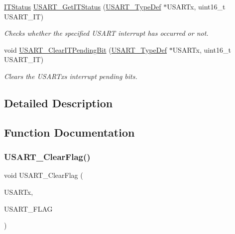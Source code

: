 \begin{DoxyCompactItemize}
\hyperlink{group___exported__types_gaacbd7ed539db0aacd973a0f6eca34074}{I\+T\+Status} \hyperlink{group___u_s_a_r_t___private___functions_ga93d8f031241bcdbe938d091a85295445}{U\+S\+A\+R\+T\+\_\+\+Get\+I\+T\+Status} (\hyperlink{struct_u_s_a_r_t___type_def}{U\+S\+A\+R\+T\+\_\+\+Type\+Def} $\ast$U\+S\+A\+R\+Tx, uint16\+\_\+t U\+S\+A\+R\+T\+\_\+\+IT)
\begin{DoxyCompactList}\small\item\em Checks whether the specified U\+S\+A\+RT interrupt has occurred or not. \end{DoxyCompactList}\item 
void \hyperlink{group___u_s_a_r_t___private___functions_ga1fc25d0338695063be5e50156955d9bc}{U\+S\+A\+R\+T\+\_\+\+Clear\+I\+T\+Pending\+Bit} (\hyperlink{struct_u_s_a_r_t___type_def}{U\+S\+A\+R\+T\+\_\+\+Type\+Def} $\ast$U\+S\+A\+R\+Tx, uint16\+\_\+t U\+S\+A\+R\+T\+\_\+\+IT)
\begin{DoxyCompactList}\small\item\em Clears the U\+S\+A\+R\+Tx\textquotesingle{}s interrupt pending bits. \end{DoxyCompactList}\end{DoxyCompactItemize}


\subsection{Detailed Description}


\subsection{Function Documentation}
\mbox{\label{group___u_s_a_r_t___private___functions_gad962e148fc466ae1b45b288f6c91d966}} 
\subsubsection{\texorpdfstring{U\+S\+A\+R\+T\+\_\+\+Clear\+Flag()}{USART\_ClearFlag()}}
{\footnotesize\ttfamily void U\+S\+A\+R\+T\+\_\+\+Clear\+Flag (\begin{DoxyParamCaption}\item[{\hyperlink{struct_u_s_a_r_t___type_def}{U\+S\+A\+R\+T\+\_\+\+Type\+Def} $\ast$}]{U\+S\+A\+R\+Tx,  }\item[{uint16\+\_\+t}]{U\+S\+A\+R\+T\+\_\+\+F\+L\+AG }\end{DoxyParamCaption})}



